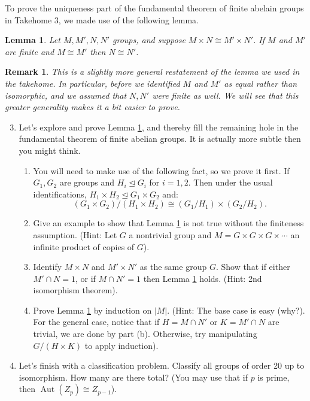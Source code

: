 \documentclass[11pt]{article}
\newtheorem{lemma}{Lemma}
\newtheorem*{remark}{Remark}
\newcommand{\Aut}{\operatorname{Aut}}
\begin{document}
To prove the uniqueness part of the fundamental theorem of finite abelain groups in Takehome 3, we made use of the following lemma.
\begin{lemma}\label{cancellation}
  Let $M,M',N,N'$ groups, and suppose $M\times N\cong M'\times N'$.  If $M$ and $M'$ are finite and $M\cong M'$ then $N\cong N'$.
\end{lemma}
\begin{remark}
  This is a slightly more general restatement of the lemma we used in the takehome.  In particular, before we identified $M$ and $M'$ as \textit{equal} rather than \textit{isomorphic}, and we assumed that $N,N'$ were finite as well.  We will see that this greater generality makes it a bit easier to prove.
\end{remark}
\begin{enumerate}
  \setcounter{enumi}{2}
  \item{
  Let's explore and prove Lemma \ref{cancellation}, and thereby fill the remaining hole in the fundamental theorem of finite abelian groups.  It is actually more subtle then you might think.
  \begin{enumerate}
    \item{
    You will need to make use of the following fact, so we prove it first.  If $G_1,G_2$ are groups and $H_i\unlhd G_i$ for $i=1,2$.  Then under the usual identifications, $H_1\times H_2\unlhd G_1\times G_2$ and:
    \[(G_1\times G_2)/(H_1\times H_2)\cong(G_1/H_1)\times(G_2/H_2).\]
    }
    \item{
    Give an example to show that Lemma \ref{cancellation} is not true without the finiteness assumption.  (Hint: Let $G$ a nontrivial group and $M = G\times G\times G\times\cdots$ an infinite product of copies of $G$).
    }
    \item{
    Identify $M\times N$ and $M'\times N'$ as the same group $G$.  Show that if either  $M'\cap N = 1$, or if $M\cap N'=1$ then Lemma \ref{cancellation} holds.  (Hint: 2nd isomorphism theorem).
    }
    \item{
    Prove Lemma \ref{cancellation} by induction on $|M|$.  (Hint: The base case is easy (why?).  For the general case, notice that if $H = M\cap N'$ or $K = M'\cap N$ are trivial, we are done by part (b).  Otherwise, try manipulating $G/(H\times K)$ to apply induction).
    }
  \end{enumerate}
  }
  \item{
  Let's finish with a classification problem.  Classify all groups of order 20 up to isomorphism.  How many are there total?  (You may use that if $p$ is prime, then $\Aut(Z_p)\cong Z_{p-1}$).
  }
\end{enumerate}
\end{document}
